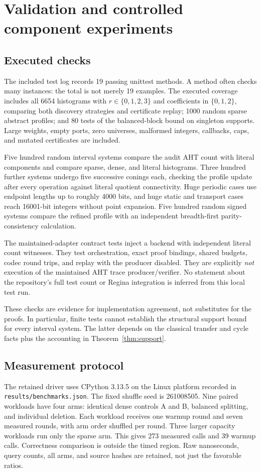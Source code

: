\documentclass[11pt]{article}
\theoremstyle{definition}
\begin{document}
\section{Validation and controlled component experiments}
\label{sec:experiments}

\subsection{Executed checks}
The included test log records 19 passing unittest methods. A method often
checks many instances: the total is not merely 19 examples. The executed
coverage includes all 6654 histograms with $r\in\{0,1,2,3\}$ and coefficients
in $\{0,1,2\}$, comparing both discovery strategies and certificate replay;
1000 random sparse abstract profiles; and 80 tests of the balanced-block
bound on singleton supports. Large weights, empty ports, zero universes,
malformed integers, callbacks, caps, and mutated certificates are included.

Five hundred random interval systems compare the audit AHT count with
literal components and compare sparse, dense, and literal histograms.
Three hundred further systems undergo five successive conings each,
checking the profile update after every operation against literal quotient
connectivity. Huge periodic cases use endpoint lengths up to roughly 4000
bits, and huge static and transport cases reach 16001-bit integers without
point expansion. Five hundred random signed systems compare the refined
profile with an independent breadth-first parity-consistency calculation.

The maintained-adapter contract tests inject a backend with independent
literal count witnesses. They test orchestration, exact proof bindings,
shared budgets, codec round trips, and replay with the producer disabled.
They are explicitly \emph{not} execution of the maintained AHT trace
producer/verifier. No statement about the repository's full test count or
Regina integration is inferred from this local test run.

These checks are evidence for implementation agreement, not substitutes for
the proofs. In particular, finite tests cannot establish the structural
support bound for every interval system. The latter depends on the
classical transfer and cycle facts plus the accounting in
Theorem~\ref{thm:support}.

\subsection{Measurement protocol}
The retained driver uses CPython 3.13.5 on the Linux platform recorded in
\texttt{results/benchmarks.json}. The fixed shuffle seed is 261008505.
Nine paired workloads have four arms: identical dense controls A and B,
balanced splitting, and individual deletion. Each workload receives one
warmup round and seven measured rounds, with arm order shuffled per round.
Three larger capacity workloads run only the sparse arm. This gives 273
measured calls and 39 warmup calls. Correctness comparison is outside the
timed region. Raw nanoseconds, query counts, all arms, and source hashes are
retained, not just the favorable ratios.
\end{document}

